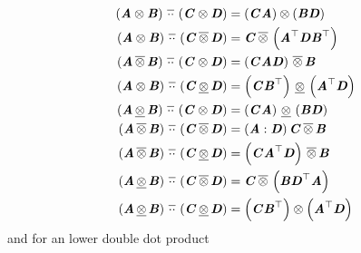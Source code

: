 \begin{align}
  \upperdoubledotprod{\pbrac{\tensorprod{\tensortwo{A}}{\tensortwo{B}}}}{\pbrac{\tensorprod{\tensortwo{C}}{\tensortwo{D}}}}&=\tensorprod{\pbrac{\tensortwo{C}{\tensortwo{A}}}}{\pbrac{\tensortwo{B}{\tensortwo{D}}}}\\
  \upperdoubledotprod{\pbrac{\tensorprod{\tensortwo{A}}{\tensortwo{B}}}}{\pbrac{\uppertensorprod{\tensortwo{C}}{\tensortwo{D}}}}&=\uppertensorprod{\tensortwo{C}}{\pbrac{\transpose{\tensortwo{A}}\tensortwo{D}\transpose{\tensortwo{B}}}}\\
  \upperdoubledotprod{\pbrac{\uppertensorprod{\tensortwo{A}}{\tensortwo{B}}}}{\pbrac{\tensorprod{\tensortwo{C}}{\tensortwo{D}}}}&=\uppertensorprod{\pbrac{\tensortwo{C}\tensortwo{A}\tensortwo{D}}}{\tensortwo{B}}\\
  \upperdoubledotprod{\pbrac{\tensorprod{\tensortwo{A}}{\tensortwo{B}}}}{\pbrac{\lowertensorprod{\tensortwo{C}}{\tensortwo{D}}}}&=\lowertensorprod{\pbrac{\tensortwo{C}\transpose{\tensortwo{B}}}}{\pbrac{\transpose{\tensortwo{A}}\tensortwo{D}}}\\
  \upperdoubledotprod{\pbrac{\lowertensorprod{\tensortwo{A}}{\tensortwo{B}}}}{\pbrac{\tensorprod{\tensortwo{C}}{\tensortwo{D}}}}&=\lowertensorprod{\pbrac{\tensortwo{C}\tensortwo{A}}}{\pbrac{\tensortwo{B}\tensortwo{D}}}\\
  \upperdoubledotprod{\pbrac{\uppertensorprod{\tensortwo{A}}{\tensortwo{B}}}}{\pbrac{\uppertensorprod{\tensortwo{C}}{\tensortwo{D}}}}&=\uppertensorprod{\pbrac{\doubledotprod{\tensortwo{A}}{\tensortwo{D}}}\tensortwo{C}}{\tensortwo{B}}\\
  \upperdoubledotprod{\pbrac{\uppertensorprod{\tensortwo{A}}{\tensortwo{B}}}}{\pbrac{\lowertensorprod{\tensortwo{C}}{\tensortwo{D}}}}&=\uppertensorprod{\pbrac{\tensortwo{C}\transpose{\tensortwo{A}}\tensortwo{D}}}{\tensortwo{B}}\\
  \upperdoubledotprod{\pbrac{\lowertensorprod{\tensortwo{A}}{\tensortwo{B}}}}{\pbrac{\uppertensorprod{\tensortwo{C}}{\tensortwo{D}}}}&=\uppertensorprod{\tensortwo{C}}{\pbrac{\tensortwo{B}\transpose{\tensortwo{D}}\tensortwo{A}}}\\
  \upperdoubledotprod{\pbrac{\lowertensorprod{\tensortwo{A}}{\tensortwo{B}}}}{\pbrac{\lowertensorprod{\tensortwo{C}}{\tensortwo{D}}}}&=\tensorprod{\pbrac{\tensortwo{C}\transpose{\tensortwo{B}}}}{\pbrac{\transpose{\tensortwo{A}}\tensortwo{D}}}
\end{align}
and for an lower double dot product
